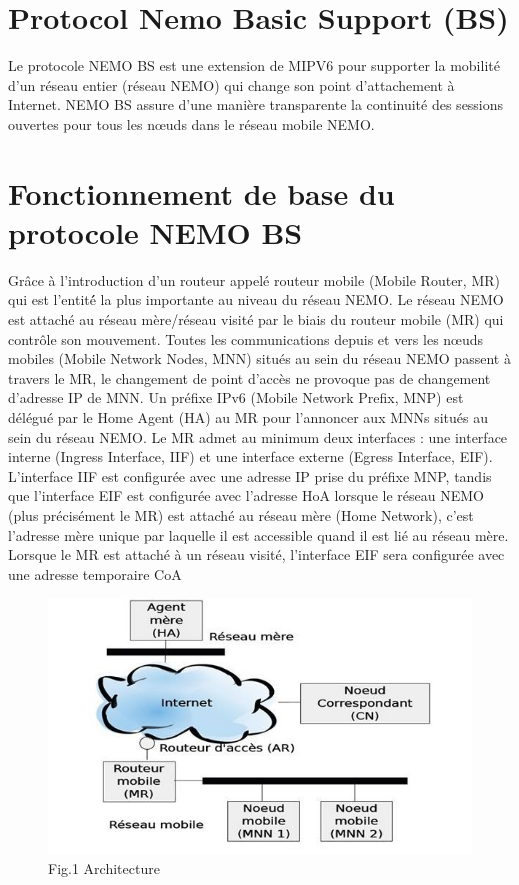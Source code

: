 \documentclass[12pt]{article}
\begin{document}
\section{Protocol Nemo  Basic Support (BS)}
Le protocole NEMO BS est une extension de MIPV6 pour supporter la mobilit\'e d'un r\'eseau entier (r\'eseau NEMO) qui change son point d'attachement \`a Internet. NEMO BS  assure d'une mani\`ere transparente la continuit\'e des sessions ouvertes pour tous les nœuds dans le r\'eseau mobile NEMO.

\newpage
\section{Fonctionnement  de base du protocole NEMO BS}

Gr\^ace \`a l'introduction d'un routeur appel\'e routeur mobile (Mobile Router, MR) qui est l'entit\'é la plus importante  au niveau du r\'eseau NEMO.
 Le réseau NEMO est attach\'e au r\'eseau m\`ere/r\'eseau visit\'e par le biais du routeur mobile (MR) qui contr\^ole son mouvement. 
Toutes les communications depuis et vers les nœuds mobiles (Mobile Network Nodes, MNN) situés au sein du r\'eseau NEMO passent \`a travers le MR, le changement de point d'acc\`es ne provoque pas de changement d'adresse IP de MNN.
 Un pr\'efixe IPv6 (Mobile Network Prefix, MNP) est d\'el\'egu\'e par le Home Agent (HA) au MR pour l’annoncer aux MNNs situ\'es au sein du r\'eseau NEMO.
Le MR admet au minimum deux interfaces : une interface interne (Ingress Interface,  IIF) et une interface externe (Egress Interface,  EIF). L'interface IIF est configur\'ee avec une adresse IP prise du pr\'efixe MNP, tandis que l'interface EIF est configur\'ee avec l'adresse HoA lorsque le r\'eseau NEMO (plus pr\'ecis\'ement le MR) est attach\'e au r\'eseau m\`ere (Home Network), c'est l'adresse m\`ere unique par laquelle il est accessible quand il est li\'e au r\'eseau m\`ere. Lorsque le MR est attach\'e \`a un r\'eseau visit\'e, l'interface EIF sera configur\'ee avec une adresse temporaire CoA

\begin{figure}[h]
\begin{center}
\includegraphics[scale=0.7]{img8.png}
\caption[9pt]{Fig.1 Architecture}
\end{center}
\end{figure}
\end{document}
